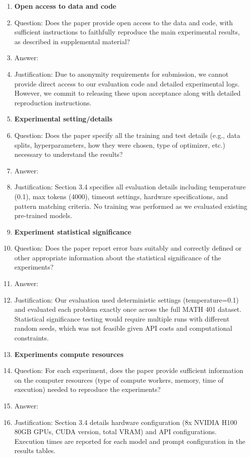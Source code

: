 \documentclass{article}
\begin{document}
\begin{enumerate}
\item {\bf Open access to data and code}
    \item[] Question: Does the paper provide open access to the data and code, with sufficient instructions to faithfully reproduce the main experimental results, as described in supplemental material?
    \item[] Answer: \answerNo{}
    \item[] Justification: Due to anonymity requirements for submission, we cannot provide direct access to our evaluation code and detailed experimental logs. However, we commit to releasing these upon acceptance along with detailed reproduction instructions.

\item {\bf Experimental setting/details}
    \item[] Question: Does the paper specify all the training and test details (e.g., data splits, hyperparameters, how they were chosen, type of optimizer, etc.) necessary to understand the results?
    \item[] Answer: \answerYes{}
    \item[] Justification: Section 3.4 specifies all evaluation details including temperature (0.1), max tokens (4000), timeout settings, hardware specifications, and pattern matching criteria. No training was performed as we evaluated existing pre-trained models.

\item {\bf Experiment statistical significance}
    \item[] Question: Does the paper report error bars suitably and correctly defined or other appropriate information about the statistical significance of the experiments?
    \item[] Answer: \answerNo{}
    \item[] Justification: Our evaluation used deterministic settings (temperature=0.1) and evaluated each problem exactly once across the full MATH 401 dataset. Statistical significance testing would require multiple runs with different random seeds, which was not feasible given API costs and computational constraints.

\item {\bf Experiments compute resources}
    \item[] Question: For each experiment, does the paper provide sufficient information on the computer resources (type of compute workers, memory, time of execution) needed to reproduce the experiments?
    \item[] Answer: \answerYes{}
    \item[] Justification: Section 3.4 details hardware configuration (8x NVIDIA H100 80GB GPUs, CUDA version, total VRAM) and API configurations. Execution times are reported for each model and prompt configuration in the results tables.


\end{enumerate}
\end{document}
